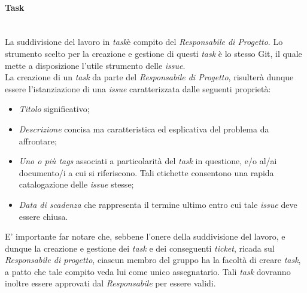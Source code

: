 \paragraph{Task} ~\\
	La suddivisione del lavoro in \textit{task}\glossario è compito del \textit{Responsabile di Progetto}. Lo strumento scelto per la creazione e gestione di questi \textit{task} è lo stesso Git\glossario, il quale mette a disposizione l'utile strumento delle \textit{issue}.\\
	La creazione di un \textit{task} da parte del \textit{Responsabile di Progetto}, risulterà dunque essere l'istanziazione di una \textit{issue} caratterizzata dalle seguenti proprietà:
	\begin{itemize}
	\item \textit{Titolo} significativo;
	\item \textit{Descrizione} concisa ma caratteristica ed esplicativa del problema da affrontare;
	\item \textit{Uno o più tags} associati a particolarità del \textit{task} in questione, e/o al/ai documento/i a cui si riferiscono. Tali etichette consentono una rapida catalogazione delle \textit{issue} stesse;
	\item \textit{Data di scadenza} che rappresenta il termine ultimo entro cui tale \textit{issue} deve essere chiusa.
	\end{itemize}
	E' importante far notare che, sebbene l'onere della suddivisione del lavoro, e dunque la creazione e gestione dei \textit{task} e dei conseguenti \textit{ticket}\glossario, ricada sul \textit{Responsabile di progetto}, ciascun membro del gruppo ha la facoltà di creare \textit{task}, a patto che tale compito veda lui come unico assegnatario. Tali \textit{task} dovranno inoltre essere approvati dal \textit{Responsabile} per essere validi.

